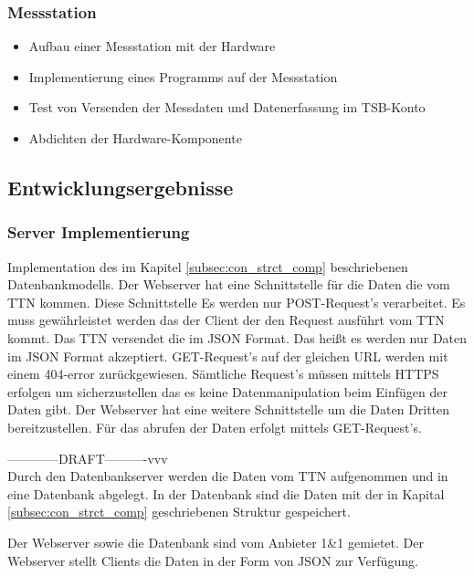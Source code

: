 \subsubsection{Messstation}
\begin{itemize}
	\item Aufbau einer Messstation mit der Hardware
	\item Implementierung eines Programms auf der Messstation
	\item Test von Versenden der Messdaten und Datenerfassung im TSB-Konto
	\item Abdichten der Hardware-Komponente
\end{itemize}

\subsection{Entwicklungsergebnisse}


\subsubsection{Server Implementierung}

Implementation des im Kapitel \ref{subsec:con_strct_comp} beschriebenen Datenbankmodells. Der Webserver hat eine Schnittstelle für die Daten die vom TTN kommen. Diese Schnittstelle Es werden nur POST-Request's verarbeitet. Es muss gewährleistet werden das der Client der den Request ausführt vom TTN kommt. Das TTN versendet die im JSON Format. Das heißt es werden nur Daten im JSON Format akzeptiert. GET-Request's auf der gleichen URL werden mit einem 404-error zurückgewiesen. Sämtliche Request's müssen mittels HTTPS erfolgen um sicherzustellen das es keine Datenmanipulation beim Einfügen der Daten gibt.
Der Webserver hat eine weitere Schnittstelle um die Daten Dritten bereitzustellen. Für das abrufen der Daten erfolgt mittels GET-Request's.

------------DRAFT----------vvv\\
Durch den Datenbankserver werden die Daten vom TTN aufgenommen und in eine Datenbank abgelegt. In der Datenbank sind die Daten mit der in Kapital \ref{subsec:con_strct_comp} geschriebenen Struktur gespeichert. 

Der Webserver sowie die Datenbank sind vom Anbieter 1\&1 gemietet. Der Webserver stellt Clients die Daten in der Form von JSON zur Verfügung.


